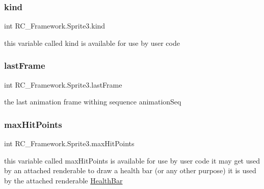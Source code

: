 \mbox{\label{class_r_c___framework_1_1_sprite3_a569b5506e5da155612f938e414d40c0b}} 
\subsubsection{\texorpdfstring{kind}{kind}}
{\footnotesize\ttfamily int R\+C\+\_\+\+Framework.\+Sprite3.\+kind}



this variable called kind is available for use by user code 

\mbox{\label{class_r_c___framework_1_1_sprite3_afc5ff18b8c0a0c4b8bb686270e0157c1}} 
\subsubsection{\texorpdfstring{last\+Frame}{lastFrame}}
{\footnotesize\ttfamily int R\+C\+\_\+\+Framework.\+Sprite3.\+last\+Frame\hspace{0.3cm}{\ttfamily [protected]}}



the last animation frame withing sequence \textquotesingle{}animation\+Seq\textquotesingle{} 

\mbox{\label{class_r_c___framework_1_1_sprite3_a7177e23ee5d4dd93ca4972e9798be680}} 
\subsubsection{\texorpdfstring{max\+Hit\+Points}{maxHitPoints}}
{\footnotesize\ttfamily int R\+C\+\_\+\+Framework.\+Sprite3.\+max\+Hit\+Points}



this variable called max\+Hit\+Points is available for use by user code it may get used by an attached renderable to draw a health bar (or any other purpose) it is used by the attached renderable \mbox{\hyperlink{class_r_c___framework_1_1_health_bar}{Health\+Bar}} 

